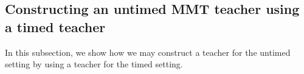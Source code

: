 %

\subsection{Constructing an untimed MMT teacher using a timed teacher}
In this subsection, we show how we may construct a teacher for the untimed setting by using a teacher for the timed setting.

